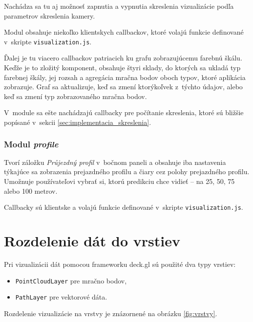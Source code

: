Nachádza sa tu aj možnosť zapnutia a vypnutia skreslenia vizualizácie podľa parametrov skreslenia kamery.

Modul obsahuje niekoľko klientskych callbackov, ktoré volajú funkcie definované v~skripte \texttt{visualization.js}.

Ďalej je tu viacero callbackov patriacich ku grafu zobrazujúcemu farebnú škálu. Keďže je to zložitý komponent, obsahuje štyri sklady, do ktorých sa ukladá typ farebnej škály, jej rozsah a agregácia mračna bodov oboch typov, ktoré aplikácia zobrazuje. Graf sa aktualizuje, keď sa zmení ktorýkoľvek z~týchto údajov, alebo keď sa zmení typ zobrazovaného mračna bodov.

V~module sa ešte nachádzajú callbacky pre počítanie skreslenia, ktoré sú bližšie popísané v~sekcii \ref{sec:implementacia_skreslenia}.

\subsubsection{Modul \emph{profile} }

Tvorí záložku \emph{Průjezdný profil} v~bočnom paneli a obsahuje iba nastavenia týkajúce sa zobrazenia prejazdného profilu a čiary cez polohy prejazdného profilu. Umožnuje používateľovi vybrať si, ktorú predikciu chce vidieť -- na 25, 50, 75 alebo 100 metrov.

Callbacky sú klientske a volajú funkcie definované v~skripte \texttt{visualization.js}.

\section{Rozdelenie dát do vrstiev}
\label{sec:vrstvy}

Pri vizualizácii dát pomocou frameworku deck.gl sú použité dva typy vrstiev:
\begin{itemize}
    \item \texttt{PointCloudLayer} pre mračno bodov,
    \item \texttt{PathLayer} pre vektorové dáta.
\end{itemize}
Rozdelenie vizualizácie na vrstvy je znázornené na obrázku \ref{fig:vrstvy}.

